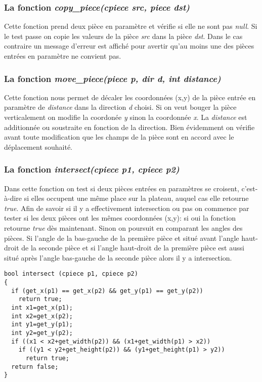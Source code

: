 \documentclass{report}
\begin{document}
\subsubsection*{La fonction \textit{copy\_piece(cpiece src, piece dst)}}
Cette fonction prend deux pièce en paramètre et vérifie si elle ne sont pas \textit{null}. Si le test passe on copie les valeurs de la pièce \textit{src} dans la pièce \textit{dst}. Dans le cas contraire un message d'erreur est affiché pour avertir qu'au moins une des pièces entrées en paramètre ne convient pas.
\subsubsection*{La fonction \textit{move\_piece(piece p, dir d, int distance)}}
Cette fonction nous permet de décaler les coordonnées (x,y) de la pièce entrée en paramètre de \textit{distance} dans la direction \textit{d} choisi. Si on veut bouger la pièce verticalement on modifie la coordonée \textit{y} sinon la coordonnée \textit{x}. La \textit{distance} est additionnée ou soustraite en fonction de la direction. Bien évidemment on vérifie avant toute modification que les champs de la pièce sont en accord avec le déplacement souhaité.
\subsubsection*{La fonction \textit{intersect(cpiece p1, cpiece p2)}}
Dans cette fonction on test si deux pièces entrées en paramètres se croisent, c'est-à-dire si elles occupent une même place sur la plateau, auquel cas elle retourne \textit{true}. Afin de savoir si il y a effectivement intersection ou pas on commence par tester si les deux pièces ont les mêmes coordonnées (x,y): si oui la fonction retourne \textit{true} dès maintenant. Sinon on poursuit en comparant les angles des pièces. Si l'angle de la bas-gauche de la première pièce et situé avant l'angle haut-droit de la seconde pièce et si l'angle haut-droit de la première pièce est aussi situé après l'angle bas-gauche de la seconde pièce alors il y a intersection.
\begin{lstlisting}
bool intersect (cpiece p1, cpiece p2)
{
  if (get_x(p1) == get_x(p2) && get_y(p1) == get_y(p2)) 
    return true;
  int x1=get_x(p1);
  int x2=get_x(p2);
  int y1=get_y(p1);
  int y2=get_y(p2);
  if ((x1 < x2+get_width(p2)) && (x1+get_width(p1) > x2))
    if ((y1 < y2+get_height(p2)) && (y1+get_height(p1) > y2))
      return true;
  return false;
}
\end{lstlisting}
\end{document}
